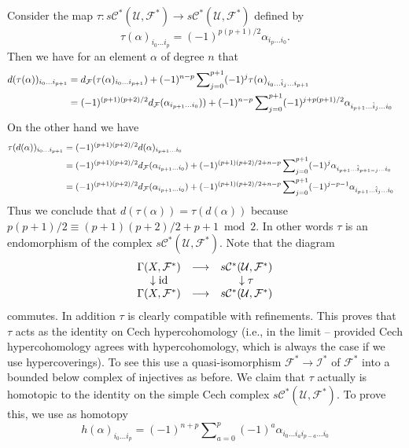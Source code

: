 \medskip\noindent
Consider the map $\tau : s{\mathcal C}^*({\mathcal U}, {\mathcal F}^*) \to
s{\mathcal C}^*({\mathcal U}, {\mathcal F}^*)$ defined by
$$
\tau(\alpha)_{i_0\ldots i_p} = (-1)^{p(p + 1)/2} \alpha_{i_p\ldots i_0}.
$$
Then we have for an element $\alpha$ of degree $n$ that
\begin{align*}
d(\tau(\alpha))_{i_0\ldots i_{p + 1}}
& =
d_{\mathcal F}(\tau(\alpha)_{i_0\ldots i_{p + 1}})
+
(-1)^{n-p}
\sum\nolimits_{j = 0}^{p + 1}
(-1)^j
\tau(\alpha)_{i_0\ldots \hat i_j\ldots i_{p + 1}}
\cr
& =
(-1)^{(p + 1)(p + 2)/2}
d_{\mathcal F}(\alpha_{i_{p + 1}\ldots i_0}))
+
(-1)^{n-p}
\sum\nolimits_{j = 0}^{p + 1}
(-1)^{j + p(p + 1)/2}
\alpha_{i_{p + 1}\ldots \hat i_j\ldots i_0}
\end{align*}
On the other hand we have
\begin{align*}
\tau(d(\alpha))_{i_0\ldots i_{p + 1}}
& =
(-1)^{(p + 1)(p + 2)/2} d(\alpha)_{i_{p + 1}\ldots i_0}
\cr
& =
(-1)^{(p + 1)(p + 2)/2}
d_{\mathcal F}(\alpha_{i_{p + 1}\ldots i_0})
+
(-1)^{(p + 1)(p + 2)/2 + n-p}
\sum\nolimits_{j = 0}^{p + 1}
(-1)^j
\alpha_{i_{p + 1}\ldots \hat i_{p + 1-j}\ldots i_0}
\cr
& =
(-1)^{(p + 1)(p + 2)/2}
d_{\mathcal F}(\alpha_{i_{p + 1}\ldots i_0})
+
(-1)^{(p + 1)(p + 2)/2 + n-p}
\sum\nolimits_{j = 0}^{p + 1}
(-1)^{j-p-1}
\alpha_{i_{p + 1}\ldots \hat i_j\ldots i_0}
\end{align*}
Thus we conclude that $d(\tau(\alpha)) = \tau(d(\alpha))$
because $p(p + 1)/2 \equiv (p + 1)(p + 2)/2 + p + 1 \bmod 2$. In other words
$\tau$ is an endomorphism of the complex
$s{\mathcal C}^*({\mathcal U}, {\mathcal F}^*)$. Note that the diagram
$$
\begin{matrix}
\Gamma(X, {\mathcal F}^*) &
\longrightarrow &
s{\mathcal C}^*({\mathcal U}, {\mathcal F}^*) \cr
\downarrow {\rm id} & & \downarrow \tau \cr
\Gamma(X, {\mathcal F}^*) &
\longrightarrow &
s{\mathcal C}^*({\mathcal U}, {\mathcal F}^*) \cr
\end{matrix}
$$
commutes. In addition $\tau$ is clearly compatible with refinements.
This proves that $\tau$ acts as the identity on Cech hypercohomology
(i.e., in the limit -- provided Cech hypercohomology agrees with
hypercohomology, which is always the case if we use hypercoverings).
To see this use a quasi-isomorphism ${\mathcal F}^* \to {\mathcal I}^*$ of
${\mathcal F}^*$ into a bounded below complex of injectives as before.
We claim that $\tau$ actually is homotopic to the identity on the
simple Cech complex $s{\mathcal C}^*({\mathcal U}, {\mathcal F}^*)$.
To prove this, we use as homotopy
$$
h(\alpha)_{i_0\ldots i_p}
=
(-1)^{n + p}
\sum\nolimits_{a = 0}^{p}
(-1)^a
\alpha_{i_0\ldots i_a i_{p-a} \ldots i_0}
$$
